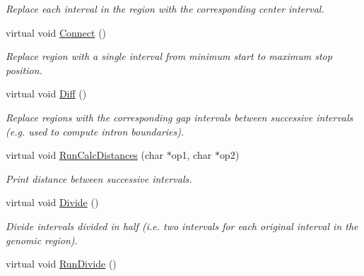 \begin{CompactItemize}
\begin{CompactList}\small\item\em Replace each interval in the region with the corresponding center interval. \item\end{CompactList}\item 
\hypertarget{classGenomicRegion_c2c426782bd7c0d302b7a77bb1ff047f}{
virtual void \hyperlink{classGenomicRegion_c2c426782bd7c0d302b7a77bb1ff047f}{Connect} ()}
\label{classGenomicRegion_c2c426782bd7c0d302b7a77bb1ff047f}

\begin{CompactList}\small\item\em Replace region with a single interval from minimum start to maximum stop position. \item\end{CompactList}\item 
\hypertarget{classGenomicRegion_869de97ecf059355fe5a5b572b5c2575}{
virtual void \hyperlink{classGenomicRegion_869de97ecf059355fe5a5b572b5c2575}{Diff} ()}
\label{classGenomicRegion_869de97ecf059355fe5a5b572b5c2575}

\begin{CompactList}\small\item\em Replace regions with the corresponding gap intervals between successive intervals (e.g. used to compute intron boundaries). \item\end{CompactList}\item 
\hypertarget{classGenomicRegion_98695d5d1056d693a1c635b197f4b8bf}{
virtual void \hyperlink{classGenomicRegion_98695d5d1056d693a1c635b197f4b8bf}{RunCalcDistances} (char $\ast$op1, char $\ast$op2)}
\label{classGenomicRegion_98695d5d1056d693a1c635b197f4b8bf}

\begin{CompactList}\small\item\em Print distance between successive intervals. \item\end{CompactList}\item 
\hypertarget{classGenomicRegion_0785438db56d7b7cc7539470e85434dd}{
virtual void \hyperlink{classGenomicRegion_0785438db56d7b7cc7539470e85434dd}{Divide} ()}
\label{classGenomicRegion_0785438db56d7b7cc7539470e85434dd}

\begin{CompactList}\small\item\em Divide intervals divided in half (i.e. two intervals for each original interval in the genomic region). \item\end{CompactList}\item 
\hypertarget{classGenomicRegion_45fe5d619f2e21644eacb6984aa47eff}{
virtual void \hyperlink{classGenomicRegion_45fe5d619f2e21644eacb6984aa47eff}{RunDivide} ()}
\label{classGenomicRegion_45fe5d619f2e21644eacb6984aa47eff}


\end{CompactItemize}
